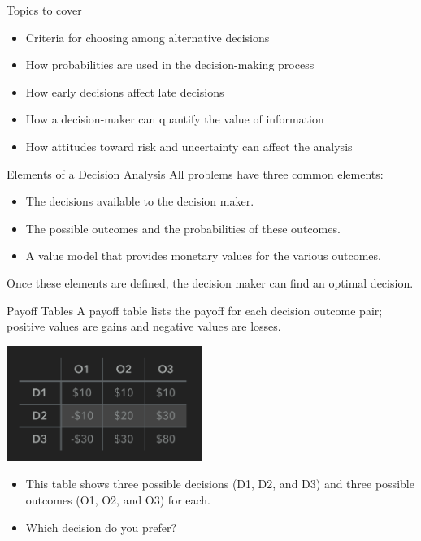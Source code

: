 \documentclass{beamer}\usepackage[]{graphicx}\usepackage[]{color}
\begin{document}
\begin{darkframes}
    \begin{frame}[fragile]{Topics to cover}
          \begin{itemize}[<+->]
            \item Criteria for choosing among alternative decisions
            \item How probabilities are used in the decision-making process
            \item How early decisions affect late decisions
            \item How a decision-maker can quantify the value of information
            \item How attitudes toward risk and uncertainty can affect the analysis
          \end{itemize}

    \end{frame}


    \begin{frame}[fragile]{Elements of a Decision Analysis}
      All problems have three common elements:

        \begin{itemize}
            \item The decisions available to the decision maker.
            \item The possible outcomes and the probabilities of these outcomes.
            \item A value model that provides monetary values for the various outcomes.
        \end{itemize}

      Once these elements are defined, the decision maker can find an optimal decision.
    \end{frame}


    \begin{frame}[fragile]{Payoff Tables}
      A payoff table lists the payoff for each decision outcome pair; positive values are gains and negative values are losses.

        \begin{center}
          \includegraphics[width=2.5in]{PayoffTable} 
        \end{center}
        \begin{itemize}
            \item This table shows three possible decisions (D1, D2, and D3) and three
            possible outcomes (O1, O2, and O3) for each.
            \item Which decision do you prefer?
        \end{itemize}


\end{frame}
\end{darkframes}
\end{document}
